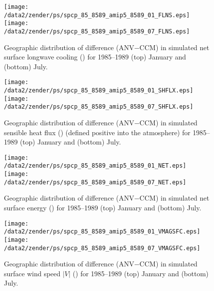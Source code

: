 \documentclass[twocolumn,final]{article}
\begin{document}
\begin{figure}
\begin{center}
\texttt{[image: /data2/zender/ps/spcp\_85\_8589\_amip5\_8589\_01\_FLNS.eps]}\vfill
\texttt{[image: /data2/zender/ps/spcp\_85\_8589\_amip5\_8589\_07\_FLNS.eps]}\vfill
\end{center}
\caption[Geographic distribution of difference (ANV$-$CCM) in
simulated net surface longwave cooling between ANV and CCM for
January and July 1985--1989]{ 
Geographic distribution of difference (ANV$-$CCM) in simulated
net surface longwave cooling (\wxmS) for 1985--1989 (top) January and
(bottom) July. 
\label{fig:spcp_85_8589_amip5_8589_FLNS}}
\end{figure}

\begin{figure}
\begin{center}
\texttt{[image: /data2/zender/ps/spcp\_85\_8589\_amip5\_8589\_01\_SHFLX.eps]}\vfill
\texttt{[image: /data2/zender/ps/spcp\_85\_8589\_amip5\_8589\_07\_SHFLX.eps]}\vfill
\end{center}
\caption[Geographic distribution of difference (ANV$-$CCM) in
simulated surface sensible heat flux between ANV and CCM for
January and July 1985--1989]{ 
Geographic distribution of difference (ANV$-$CCM) in simulated
sensible heat flux (\wxmS) (defined positive into the atmosphere) for
1985--1989 (top) January and (bottom) July. 
\label{fig:spcp_85_8589_amip5_8589_SHFLX}}
\end{figure}
\clearpage

\begin{figure}
\begin{center}
\texttt{[image: /data2/zender/ps/spcp\_85\_8589\_amip5\_8589\_01\_NET.eps]}\vfill
\texttt{[image: /data2/zender/ps/spcp\_85\_8589\_amip5\_8589\_07\_NET.eps]}\vfill
\end{center}
\caption[Geographic distribution of difference (ANV$-$CCM) in
simulated net surface energy between ANV and CCM for January and July
1985--1989]{  
Geographic distribution of difference (ANV$-$CCM) in simulated
net surface energy (\wxmS) for 1985--1989 (top) January and (bottom)
July.  
\label{fig:spcp_85_8589_amip5_8589_NET}}
\end{figure}

\begin{figure}
\begin{center}
\texttt{[image: /data2/zender/ps/spcp\_85\_8589\_amip5\_8589\_01\_VMAGSFC.eps]}\vfill
\texttt{[image: /data2/zender/ps/spcp\_85\_8589\_amip5\_8589\_07\_VMAGSFC.eps]}\vfill
\end{center}
\caption[Geographic distribution of difference (ANV$-$CCM) in
surface wind speed $|V|$ between ANV and CCM for January and July
1985--1989]{  
Geographic distribution of difference (ANV$-$CCM) in simulated
surface wind speed $|V|$ (\mxs) for 1985--1989 (top) January and
(bottom) July.  
\label{fig:spcp_85_8589_amip5_8589_VMAGSFC}}
\end{figure}
\end{document}
